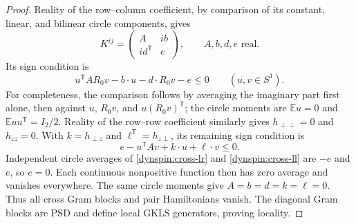 \documentclass[reqno]{amsart}
\theoremstyle{definition}
\theoremstyle{remark}
\begin{document}
\begin{proof}
Reality of the row--column coefficient, by comparison of its constant,
linear, and bilinear circle components, gives
\[
 K^{ij}=\begin{pmatrix}A&i b\\i d^{\mathsf T}&e\end{pmatrix},
 \qquad A,b,d,e\text{ real}.
\]
Its sign condition is
\begin{equation}\label{dynspin:cross-lr}
 u^{\mathsf T}AR_0v-b\cdot u-d\cdot R_0v-e\leq0
 \qquad (u,v\in S^1).
\end{equation}
For completeness, the comparison follows by averaging the imaginary
part first alone, then against $u$, $R_0v$, and $u(R_0v)^{\mathsf T}$;
the circle moments are $\mathbb E u=0$ and
$\mathbb E uu^{\mathsf T}=I_2/2$.
Reality of the row--row coefficient similarly gives $h_{\perp\perp}=0$
and $h_{zz}=0$.  With $k=h_{\perp z}$ and
$\ell^{\mathsf T}=h_{z\perp}$, its remaining sign condition is
\begin{equation}\label{dynspin:cross-ll}
 e-u^{\mathsf T}Av+k\cdot u+\ell\cdot v\leq0.
\end{equation}
Independent circle averages of \eqref{dynspin:cross-lr} and
\eqref{dynspin:cross-ll} are $-e$ and $e$, so $e=0$.
Each continuous nonpositive function then has zero average and vanishes
everywhere.  The same circle moments give $A=b=d=k=\ell=0$.
Thus all cross Gram blocks and pair Hamiltonians vanish.  The diagonal
Gram blocks are PSD and define local GKLS generators, proving locality.
\end{proof}
\end{document}
